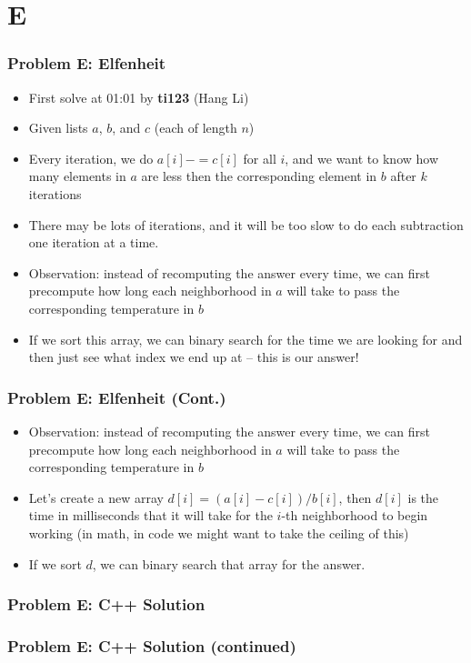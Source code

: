 \section{E}%
\label{sec:e}

\begin{frame}
  \frametitle{Problem E: Elfenheit}
  \begin{itemize}
    \item First solve at 01:01 by \textbf{ti123} (Hang Li)
    \item Given lists $a$, $b$, and $c$ (each of length $n$)
    \item Every iteration, we do $a[i] -= c[i]$ for all $i$, and we want to know how many elements in $a$
      are less then the corresponding element in $b$ after $k$ iterations
    \item There may be lots of iterations, and it will be too slow to do each subtraction one
      iteration at a time.
    \item Observation: instead of recomputing the answer every time, we can first precompute how long each
      neighborhood in $a$ will take to pass the corresponding temperature in $b$
    \item If we sort this array, we can binary search for the time we are looking for and then just see
      what index we end up at -- this is our answer!
  \end{itemize}
\end{frame}

\begin{frame}
  \frametitle{Problem E: Elfenheit (Cont.)}
  \begin{itemize}
    \item Observation: instead of recomputing the answer every time, we can first precompute how long each
      neighborhood in $a$ will take to pass the corresponding temperature in $b$
    \item Let's create a new array $d[i] = (a[i] - c[i]) / b[i]$, then $d[i]$ is the time in
      milliseconds that it will take for the $i$-th neighborhood to begin working (in math, in code
      we might want to take the ceiling of this)
    \item If we sort $d$, we can binary search that array for the answer.
  \end{itemize}
\end{frame}

\begin{frame}
  \frametitle{Problem E: C++ Solution}
\end{frame}
\begin{frame}
  \frametitle{Problem E: C++ Solution (continued)}
\end{frame}
